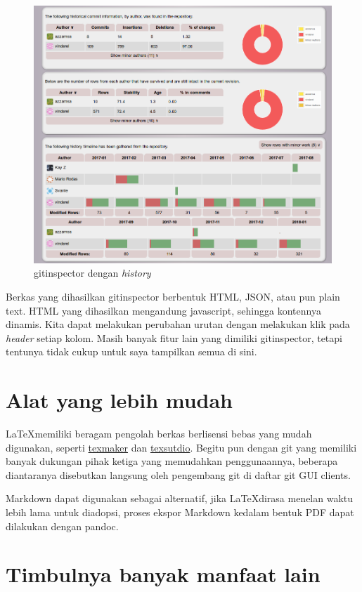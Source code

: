 \documentclass[a4paper,11pt]{article}
\begin{document}
\begin{figure}[tp]
  \centering
  \includegraphics[width=.8\linewidth]{img/gi-2.png}
  \caption{gitinspector dengan \emph{history}}
  \label{fig:gi-t}
\end{figure}

Berkas yang dihasilkan gitinspector berbentuk HTML, JSON, atau pun
plain text. HTML yang dihasilkan mengandung javascript, sehingga
kontennya dinamis. Kita dapat melakukan perubahan urutan dengan
melakukan klik pada \emph{header} setiap kolom. Masih banyak fitur
lain yang dimiliki gitinspector\cite{gi-docs}, tetapi tentunya tidak
cukup untuk saya tampilkan semua di sini.

\section{Alat yang lebih mudah}
\label{sec:alat-mudah}

\LaTeX memiliki beragam pengolah berkas berlisensi bebas yang mudah
digunakan, seperti \href{http://www.xm1math.net/texmaker/}{texmaker}
dan \href{https://www.texstudio.org/}{texsutdio}. Begitu pun dengan
git yang memiliki banyak dukungan pihak ketiga yang memudahkan
penggunaannya, beberapa diantaranya disebutkan langsung oleh
pengembang git di daftar git GUI clients\cite{git-clients}.

Markdown dapat digunakan sebagai alternatif, jika \LaTeX dirasa
menelan waktu lebih lama untuk diadopsi, proses ekspor Markdown
kedalam bentuk PDF dapat dilakukan dengan pandoc.

\section{Timbulnya banyak manfaat lain}
\label{manfaat-lain}
\end{document}

